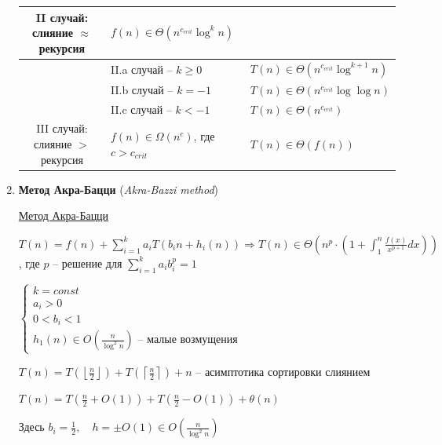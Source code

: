 \documentclass[12pt]{article}
\begin{document}
\begin{enumerate}
\begin{tabular}{cll}
            \hline

            II случай: слияние $\approx$ рекурсия & $f(n) \in \Theta(n^{c_{crit}} \log^k n)$ & \\

            \hline

            & II.a случай -- $k \geq 0$ & $T(n) \in \Theta(n^{c_{crit}} \log^{k + 1} n)$ \\

            & II.b случай -- $k = -1$ & $T(n) \in \Theta(n^{c_{crit}} \log \log n)$ \\

            & II.c случай -- $k < -1$ & $T(n) \in \Theta(n^{c_{crit}})$ \\

            \hline

            III случай: слияние $>$ рекурсия & $f(n) \in \Omega(n^c)$, где $c > c_{crit}$ & $T(n) \in \Theta(f(n))$\\

            \hline

        \end{tabular}

        \item \textbf{Метод Акра-Бацци} (\textit{Akra-Bazzi method})

        \hyperlink{akrabazzimethod}{Метод Акра-Бацци}

        $T(n) = f(n) + \sum_{i = 1}^k a_i T(b_i n + h_i(n)) \Longrightarrow T(n) \in \Theta\left(n^p \cdot \left(1 + \int_1^n \frac{f(x)}{x^{p + 1}} dx\right)\right)$, где $p$ -- решение для $\sum_{i = 1}^k a_i b_i^p = 1$

        $\begin{cases}
            k = const \\
            a_i > 0 \\
            0 < b_i < 1 \\
            h_1(n) \in O\left(\frac{n}{\log^2 n}\right) \text{ -- малые возмущения}
        \end{cases}$

        \Ex $T(n) = T\left(\left\lfloor\frac{n}{2}\right\rfloor\right) + T\left(\left\lceil\frac{n}{2}\right\rceil\right) + n$ -- асимптотика сортировки слиянием

        $T(n) = T\left(\frac{n}{2} + O(1)\right) + T\left(\frac{n}{2} - O(1)\right) + \theta(n)$

        Здесь $b_i = \frac{1}{2}, \quad h = \pm O(1) \in O\left(\frac{n}{\log^2 n}\right)$

    \end{enumerate}
\end{document}
